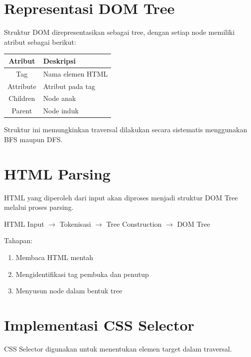 \section{Representasi DOM Tree}

Struktur DOM direpresentasikan sebagai tree, dengan setiap node memiliki atribut sebagai berikut:

\begin{center}
\begin{tabular}{|c|l|}
\hline
Atribut & Deskripsi \\
\hline
Tag & Nama elemen HTML \\
Attribute & Atribut pada tag \\
Children & Node anak \\
Parent & Node induk \\
\hline
\end{tabular}
\end{center}

Struktur ini memungkinkan traversal dilakukan secara sistematis menggunakan BFS maupun DFS.


\section{HTML Parsing}

HTML yang diperoleh dari input akan diproses menjadi struktur DOM Tree melalui proses parsing.

\begin{tcolorbox}[colback=blue!5,title=Alur Parsing]
HTML Input $\rightarrow$ Tokenisasi $\rightarrow$ Tree Construction $\rightarrow$ DOM Tree
\end{tcolorbox}

Tahapan:
\begin{enumerate}
    \item Membaca HTML mentah
    \item Mengidentifikasi tag pembuka dan penutup
    \item Menyusun node dalam bentuk tree
\end{enumerate}


\section{Implementasi CSS Selector}

CSS Selector digunakan untuk menentukan elemen target dalam traversal.


